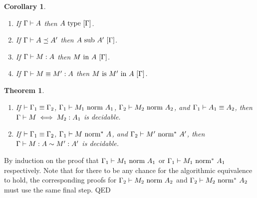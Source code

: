 \documentclass{article}
\theoremstyle{break}
\newtheorem{theorem}{Theorem}
\newtheorem{corollary}{Corollary}
\newcommand{\qed}{\mbox{QED}}
\newcommand{\equivcontext}[2]{\vdash #1 \equiv #2}
\newenvironment{proof}{\noindent{\bf Proof:}\hspace*{0.5em}}{\hspace*{\fill}\qed}
\begin{document}
\begin{corollary}
\begin{enumerate}
\item If $\Gamma\vdash A$ then ${A}\mathrm{\ type\ }[\Gamma]$.
\item If $\mbox{$\Gamma\vdash A \preceq A'$}$ then ${A}\mathrm{\ sub\ }{A'}\ [\Gamma]$.
\item If $\Gamma\vdash M : A$ then
 ${M}\mathrm{\ in\ }{A}\ [\Gamma]$.
\item If $\Gamma\vdash M \equiv M' : A$ then
 ${M}\mathrm{\ is\ }{M'}\mathrm{\ in\ }{A}\ [\Gamma]$.
\end{enumerate}
\end{corollary}



\begin{theorem}
\begin{enumerate}
\item If $\equivcontext{\context_1}{\context_2}$,
${\Gamma_1}\vdash{M_1}\mbox{\ norm\ }{A_1}$,
${\Gamma_2}\vdash{M_2}\mbox{\ norm\ }{A_2}$, and
$\Gamma_1\vdash A_1 \equiv A_2$,
then 
$\Gamma\vdash M \iff M_2 : A_1$
is decidable.
\item If $\equivcontext{\context_1}{\context_2}$,
${\Gamma_1}\vdash{M}\mbox{\ norm}^*\ {A}$, and
${\Gamma_2}\vdash{M'}\mbox{\ norm}^*\ {A'}$, then
$\Gamma\vdash M : A \sim M' : A'$
is decidable.
\end{enumerate}
\end{theorem}

\begin{proof}
By induction on the proof that ${\Gamma_1}\vdash{M_1}\mbox{\ norm\ }{A_1}$
or ${\Gamma_1}\vdash{M_1}\mbox{\ norm}^*\ {A_1}$ respectively.  Note
that for there to be any chance for the algorithmic equivalence to hold,
the corresponding proofs for ${\Gamma_2}\vdash{M_2}\mbox{\ norm\ }{A_2}$
and ${\Gamma_2}\vdash{M_2}\mbox{\ norm}^*\ {A_2}$ must use the same final step.
\end{proof}

%
%
\end{document}
